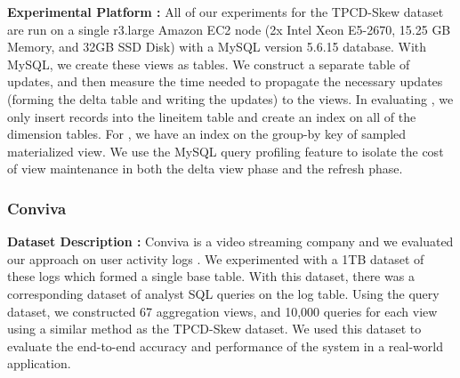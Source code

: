 \vspace{0.5em}

{\noindent \bf Experimental Platform :}
All of our experiments for the TPCD-Skew dataset are run on a single r3.large Amazon EC2 node (2x Intel Xeon E5-2670, 15.25 GB Memory, and 32GB SSD Disk) with a MySQL version 5.6.15 database.
With MySQL, we create these views as tables.
We construct a separate table of updates, and then measure the time needed to propagate the necessary updates (forming the delta table and writing the updates) to the views.
In evaluating \fjview, we only insert records into the lineitem table and create an index on all of the dimension tables.
For \aggview, we have an index on the group-by key of sampled materialized view.
We use the MySQL query profiling feature to isolate the cost of view maintenance in both the delta view phase and the refresh phase.

\subsubsection{Conviva}
{\noindent \bf Dataset Description :}
Conviva is a video streaming company and we evaluated our approach on user activity logs \cite{conviva}.
We experimented with a 1TB dataset of these logs which formed a single base table.
With this dataset, there was a corresponding dataset of analyst SQL queries on the log table.
Using the query dataset, we constructed 67 aggregation views, and 10,000 queries for each view using a similar method as the TPCD-Skew dataset. 
We used this dataset to evaluate the end-to-end accuracy and performance of the system in a real-world application. %

\vspace{0.5em}


